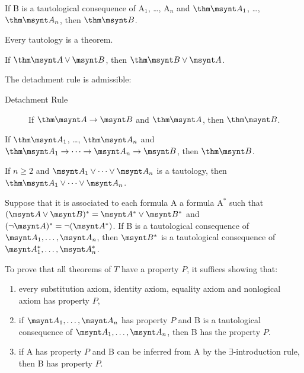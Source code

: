 \begin{theorem}
	If \synt B is a tautological consequence of \synt A$_1$, \dots, 
	\synt A$_n$ and $\thm \msynt A_1$, \dots, $\thm \msynt A_n$,
	then $\thm \msynt B$.
\end{theorem}

\begin{corollary}
	Every tautology is a theorem.
\end{corollary}

\begin{lemma}
	If $\thm \msynt A \lor \msynt B$, then $\thm \msynt B \lor \msynt A$.
\end{lemma}

\begin{fact}
	The detachment rule is admissible: %
	\begin{description}
		\item[Detachment Rule] If $\thm \msynt A \to \msynt B$ and 
		$\thm \msynt A$, then $\thm \msynt B$.
	\end{description}
\end{fact}

\begin{corollary}
	If $\thm \msynt A_1$, \dots, $\thm \msynt A_n$ and
	$\thm \msynt A_1\to \dots\to\msynt A_n\to\msynt B$, then
	$\thm \msynt B$.
\end{corollary}

\begin{lemma}
	If $n\ge 2$ and $\msynt A_1 \lor \dots \lor \msynt A_n$ is a tautology,
	then $\thm \msynt A_1 \lor \dots \lor \msynt A_n$.
\end{lemma}

\begin{fact}
	Suppose that it is associated to each formula \synt A a formula \synt A$^*$
	such that $(\msynt A \lor \msynt B)^* = \msynt A^* \lor \msynt B^*$ and 
	$(\lnot \msynt A)^* = \lnot (\msynt A^*)$. If \synt B is a tautological
	consequence of $\msynt A_1, \dots, \msynt A_n$, then $\msynt B^*$ is a tautological
	consequence of $\msynt A_1^*, \dots, \msynt A_n^*$.
\end{fact}

\begin{fact}
	To prove that all theorems of $T$ have a property $P$, it suffices showing 
	that:
	\begin{enumerate}
		\item every substitution axiom, identity axiom, equality axiom and nonlogical axiom
		has property $P$,
		\item if $\msynt A_1,\dots,\msynt A_n$ has property $P$ and \synt B is a tautological
		consequence of $\msynt A_1,\dots,\msynt A_n$, then \synt B has the property $P$.
		\item if \synt A has property $P$ and \synt B can be inferred from \synt A
		by the $\exists$-introduction rule, then \synt B has property $P$.
	\end{enumerate}
\end{fact}